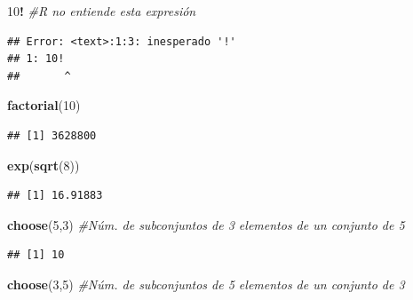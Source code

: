 \documentclass[]{book}
\newenvironment{Shaded}{\begin{snugshade}}{\end{snugshade}}
\newcommand{\CommentTok}[1]{\textcolor[rgb]{0.56,0.35,0.01}{\textit{#1}}}
\newcommand{\DecValTok}[1]{\textcolor[rgb]{0.00,0.00,0.81}{#1}}
\newcommand{\KeywordTok}[1]{\textcolor[rgb]{0.13,0.29,0.53}{\textbf{#1}}}
\newcommand{\NormalTok}[1]{#1}
\newcommand{\OperatorTok}[1]{\textcolor[rgb]{0.81,0.36,0.00}{\textbf{#1}}}
\newcommand{\StringTok}[1]{\textcolor[rgb]{0.31,0.60,0.02}{#1}}
\theoremstyle{definition}
\theoremstyle{definition}
\theoremstyle{definition}
\theoremstyle{remark}
\begin{document}
\begin{Shaded}
\begin{Highlighting}[]
\DecValTok{10}\OperatorTok{!}\StringTok{ }\CommentTok{#R no entiende esta expresión}
\end{Highlighting}
\end{Shaded}

\begin{verbatim}
## Error: <text>:1:3: inesperado '!'
## 1: 10!
##       ^
\end{verbatim}

\begin{Shaded}
\begin{Highlighting}[]
\KeywordTok{factorial}\NormalTok{(}\DecValTok{10}\NormalTok{)}
\end{Highlighting}
\end{Shaded}

\begin{verbatim}
## [1] 3628800
\end{verbatim}

\begin{Shaded}
\begin{Highlighting}[]
\KeywordTok{exp}\NormalTok{(}\KeywordTok{sqrt}\NormalTok{(}\DecValTok{8}\NormalTok{))}
\end{Highlighting}
\end{Shaded}

\begin{verbatim}
## [1] 16.91883
\end{verbatim}

\begin{Shaded}
\begin{Highlighting}[]
\KeywordTok{choose}\NormalTok{(}\DecValTok{5}\NormalTok{,}\DecValTok{3}\NormalTok{)  }\CommentTok{#Núm. de subconjuntos de 3 elementos de un conjunto de 5 }
\end{Highlighting}
\end{Shaded}

\begin{verbatim}
## [1] 10
\end{verbatim}

\begin{Shaded}
\begin{Highlighting}[]
\KeywordTok{choose}\NormalTok{(}\DecValTok{3}\NormalTok{,}\DecValTok{5}\NormalTok{)  }\CommentTok{#Núm. de subconjuntos de 5 elementos de un conjunto de 3}
\end{Highlighting}
\end{Shaded}
\end{document}
